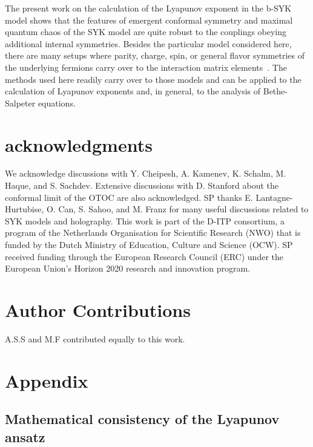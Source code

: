 The present work on the calculation of the Lyapunov exponent in the b-SYK model shows that the features of emergent conformal symmetry and maximal quantum chaos of the SYK model are quite robust to the couplings obeying additional internal symmetries.
Besides the particular model considered here, there are many setups where parity, charge, spin,
or general flavor symmetries of the underlying fermions carry over to the interaction matrix elements~\cite{Chowdhury-RMP2022,Franz2018-review,Kim2019,sahoo_traversable_2020,xu_sparse_2020}.
The methods used here readily carry over to those models and can be applied to the calculation of Lyapunov exponents and, in general, to the analysis of Bethe-Salpeter equations.


\section*{acknowledgments}
	We acknowledge discussions with Y. Cheipesh, A. Kamenev, K. Schalm, M. Haque, and S. Sachdev. Extensive discussions with D. Stanford about the conformal limit of the OTOC are also acknowledged.
	SP thanks E. Lantagne-Hurtubise, O. Can, S. Sahoo, and M. Franz for many useful discussions related to SYK models and holography.  This work is part of the D-ITP consortium,
	a program of the Netherlands Organisation for Scientific Research (NWO) that is funded by the Dutch Ministry of Education, Culture and Science (OCW).
	SP received funding through the European Research Council (ERC) under the European Union's Horizon 2020 research and innovation program.


\section*{Author Contributions}
A.S.S and M.F contributed equally to this work.

\newpage
\section{Appendix}

\subsection{Mathematical consistency of the Lyapunov ansatz}
\label{sec:technical_explanation}

